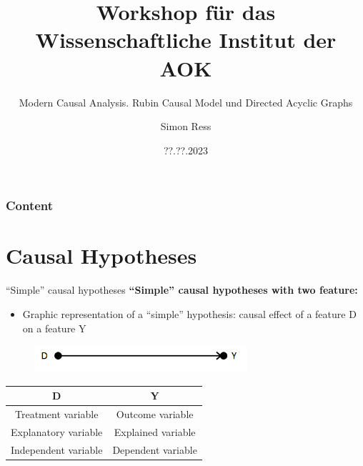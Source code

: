 \documentclass{beamer}\usepackage[]{graphicx}\usepackage[]{xcolor}
\author{Simon Ress}
\institute{Ruhr-Universität Bochum}
\title{Workshop für das Wissenschaftliche Institut der AOK}
\subtitle{Modern Causal Analysis. Rubin Causal Model und Directed Acyclic Graphs}
\date{??.??.2023}
\begin{document}

\maketitle

\begin{frame}
\frametitle{Content} 
\tableofcontents
\end{frame}


\section{Causal Hypotheses} %


\begin{frame}{“Simple” causal hypotheses}
\textbf{“Simple” causal hypotheses with two feature:}
  \begin{itemize}
    \item Graphic representation of a “simple” hypothesis: causal effect of a feature D on a feature Y
  \end{itemize}
  \begin{figure}
	\centering
	\includegraphics[width=0.7\textwidth]{Graphics/D_on_Y.png}
  \end{figure}
  
  \begin{table}[]
    \begin{tabular}{cc}
    \hline \hline
    \textbf{D}           & \textbf{Y}         \\ \hline
    Treatment variable   & Outcome variable   \\
    Explanatory variable  & Explained variable  \\
    Independent variable & Dependent variable \\ \hline \hline
    \end{tabular}
  \end{table}
  
\end{frame}
\end{document}
